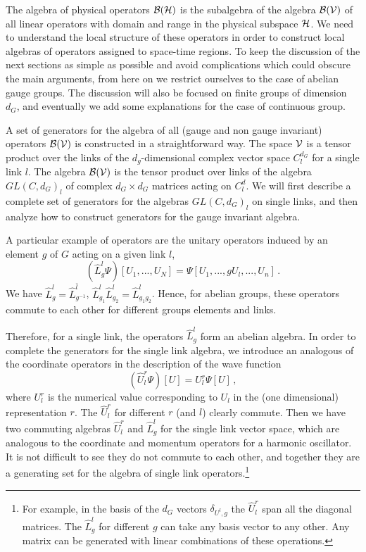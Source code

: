 \documentclass[12pt,a4paper]{article}
\newcommand{\be}{\begin{equation}}
\newcommand{\ee}{\end{equation}}
\def\be{\begin{equation}}
\def\ee{\end{equation}}
\begin{document}
The algebra of physical operators ${\cal B}({\cal H})$ is the subalgebra of the algebra ${\cal B}({\cal V})$ of all 
linear operators with domain and range in the physical subspace ${\cal H}$. We need to understand the local structure 
of these operators in order to construct local algebras of operators assigned to space-time regions. To keep the 
discussion of the next sections as simple as possible and avoid complications which could obscure the 
main arguments, from here on we restrict ourselves to the case of abelian gauge groups. The discussion will also be focused on finite groups of dimension $d_G$, and eventually we add some explanations for the case of continuous group.
 

A set of generators for the algebra of all (gauge and non gauge invariant) operators ${\cal B}({\cal V})$ is constructed 
in a straightforward way. The space ${\cal V}$ is a tensor product over 
the links of the $d_g$-dimensional complex vector space $C^{d_G}_l$ for a single link $l$. The algebra ${\cal B}({\cal V})$ is the tensor product 
over links of the algebra $GL(C,d_G)_{l}$ of complex $d_G\times d_G$ matrices acting on $C^d_l$. We will first describe a 
complete set of generators for the algebras $GL(C,d_G)_{l}$ on single links, and then analyze how to construct generators 
for the gauge invariant algebra. 

A particular example of operators are the unitary operators induced by an element $g$ of $G$ acting 
 on a given link $l$,
\be
(\hat{L}_g^{l} \Psi)[U_1,...,U_N]=\Psi[U_1,...,g U_{l},...,U_n]\,.
\ee
We have $\hat{L}_g^{l}=\hat{L}_{g^{-1}}^{\bar{l}}$, $\hat{L}_{g_1}^l \hat{L}_{g_2}^l=\hat{L}_{g_1 g_2}^l$. Hence, for 
abelian groups, these operators commute to each other for different groups elements and links. 

Therefore, for a single link, the operators $\hat{L}_g^l$ form an abelian algebra. In order to complete the generators for the 
single link algebra, we introduce an analogous of the coordinate operators in the description of the wave function
\be
(\hat{U}^{r}_l \Psi)[U]=U^{r}_l \Psi[U]\,,
\ee
where $U^r_l$ is the numerical value corresponding to $U_l$ in the (one dimensional) representation $r$. The $\hat{U}^r_l$ 
for different $r$ (and $l$) clearly commute. Then we have two commuting algebras $\hat{U}^r_l$ and $\hat{L}_g^l$ for the single 
link vector space, which are analogous to the coordinate and momentum operators for a harmonic oscillator. It is not difficult 
to see they do not commute to each other, and together they are a generating set for the algebra of single link 
operators.\footnote{For example, in the basis of the $d_G$ vectors $\delta_{U^l,g}$ the $\hat{U}^r_l$ span all the diagonal 
matrices. The $\hat{L}_g^l$ for different $g$ can take any basis vector to any other. Any matrix can be generated with linear combinations of these operations.}  
\end{document}
